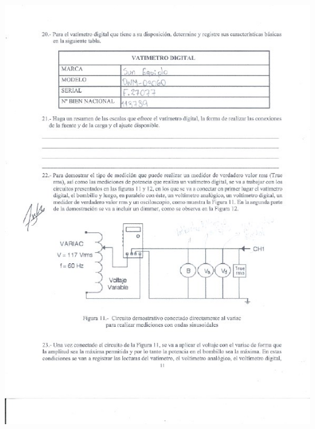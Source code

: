 \documentclass[12pt]{article}
\begin{document}
	\includegraphics[width=16cm,height=21cm]{Img/Resultados_8}\\
\end{document}
